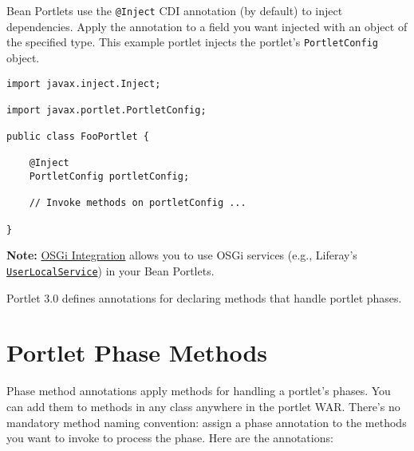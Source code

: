 Bean Portlets use the \texttt{@Inject} CDI annotation (by default) to
inject dependencies. Apply the annotation to a field you want injected
with an object of the specified type. This example portlet injects the
portlet's \texttt{PortletConfig} object.

\begin{verbatim}
import javax.inject.Inject;

import javax.portlet.PortletConfig;

public class FooPortlet {

    @Inject
    PortletConfig portletConfig;

    // Invoke methods on portletConfig ...

}
\end{verbatim}

\noindent\hrulefill

\textbf{Note:}
\href{/docs/7-2/frameworks/-/knowledge_base/f/osgi-cdi-integration}{OSGi
Integration} allows you to use OSGi services (e.g., Liferay's
\href{https://docs.liferay.com/dxp/portal/7.2-latest/javadocs/portal-kernel/com/liferay/portal/kernel/service/UserLocalService.html}{\texttt{UserLocalService}})
in your Bean Portlets.

\noindent\hrulefill

Portlet 3.0 defines annotations for declaring methods that handle
portlet phases.

\section{Portlet Phase Methods}\label{portlet-phase-methods}

Phase method annotations apply methods for handling a portlet's phases.
You can add them to methods in any class anywhere in the portlet WAR.
There's no mandatory method naming convention: assign a phase annotation
to the methods you want to invoke to process the phase. Here are the
annotations:

\noindent\hrulefill

